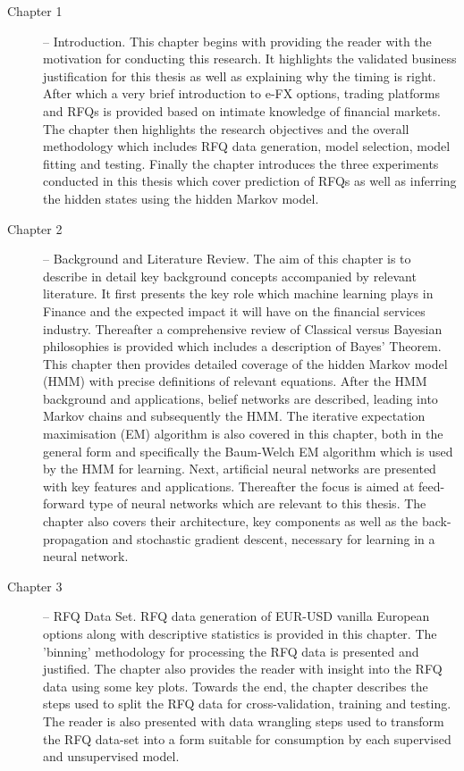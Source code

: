 \begin{description}

\item[Chapter 1] -- Introduction. This chapter begins with providing the reader with the motivation for conducting this research. It highlights the validated business justification for this thesis as well as explaining why the timing is right. After which a very brief introduction to e-FX options, trading platforms and RFQs is provided based on intimate knowledge of financial markets. The chapter then highlights the research objectives and the overall methodology which includes RFQ data generation, model selection, model fitting and testing. Finally the chapter introduces the three experiments conducted in this thesis which cover prediction of RFQs as well as inferring the hidden states using the hidden Markov model.

\item[Chapter 2] -- Background and Literature Review. The aim of this chapter is to describe in detail key background concepts accompanied by relevant literature. It first presents the key role which machine learning plays in Finance and the expected impact it will have on the financial services industry. Thereafter a comprehensive review of Classical versus Bayesian philosophies is provided which includes a description of Bayes' Theorem. \\
This chapter then provides detailed coverage of the hidden Markov model (HMM) with precise definitions of relevant equations. After the HMM background and applications, belief networks are described, leading into Markov chains and subsequently the HMM. The iterative expectation maximisation (EM) algorithm is also covered in this chapter, both in the general form and specifically the Baum-Welch EM algorithm which is used by the HMM for learning.
Next, artificial neural networks are presented with key features and applications. Thereafter the focus is aimed at feed-forward type of neural networks which are relevant to this thesis. The chapter also covers their architecture, key components as well as the back-propagation and stochastic gradient descent, necessary for learning in a neural network.

\item[Chapter 3] -- RFQ Data Set. RFQ data generation of EUR-USD vanilla European options along with descriptive statistics is provided in this chapter. The 'binning' methodology for processing the RFQ data is presented and justified. The chapter also provides the reader with insight into the RFQ data using some key plots. Towards the end, the chapter describes the steps used to split the RFQ data for cross-validation, training and testing. The reader is also presented with data wrangling steps used to transform the RFQ data-set into a form suitable for consumption by each supervised and unsupervised model.


\end{description}
